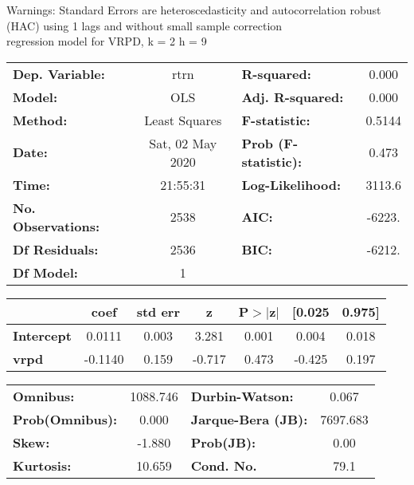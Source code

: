 Warnings: \newline
 [1] Standard Errors are heteroscedasticity and autocorrelation robust (HAC) using 1 lags and without small sample correction\\ 

regression model for VRPD, k = 2 h = 9\begin{center}
\begin{tabular}{lclc}
\toprule
\textbf{Dep. Variable:}    &       rtrn       & \textbf{  R-squared:         } &     0.000   \\
\textbf{Model:}            &       OLS        & \textbf{  Adj. R-squared:    } &     0.000   \\
\textbf{Method:}           &  Least Squares   & \textbf{  F-statistic:       } &    0.5144   \\
\textbf{Date:}             & Sat, 02 May 2020 & \textbf{  Prob (F-statistic):} &    0.473    \\
\textbf{Time:}             &     21:55:31     & \textbf{  Log-Likelihood:    } &    3113.6   \\
\textbf{No. Observations:} &        2538      & \textbf{  AIC:               } &    -6223.   \\
\textbf{Df Residuals:}     &        2536      & \textbf{  BIC:               } &    -6212.   \\
\textbf{Df Model:}         &           1      & \textbf{                     } &             \\
\bottomrule
\end{tabular}
\begin{tabular}{lcccccc}
                   & \textbf{coef} & \textbf{std err} & \textbf{z} & \textbf{P$> |$z$|$} & \textbf{[0.025} & \textbf{0.975]}  \\
\midrule
\textbf{Intercept} &       0.0111  &        0.003     &     3.281  &         0.001        &        0.004    &        0.018     \\
\textbf{vrpd}      &      -0.1140  &        0.159     &    -0.717  &         0.473        &       -0.425    &        0.197     \\
\bottomrule
\end{tabular}
\begin{tabular}{lclc}
\textbf{Omnibus:}       & 1088.746 & \textbf{  Durbin-Watson:     } &    0.067  \\
\textbf{Prob(Omnibus):} &   0.000  & \textbf{  Jarque-Bera (JB):  } & 7697.683  \\
\textbf{Skew:}          &  -1.880  & \textbf{  Prob(JB):          } &     0.00  \\
\textbf{Kurtosis:}      &  10.659  & \textbf{  Cond. No.          } &     79.1  \\
\bottomrule
\end{tabular}
\end{center}

